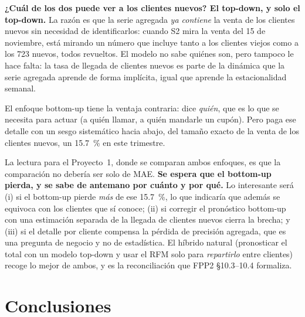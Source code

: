 \documentclass[11pt]{article}
\begin{document}
\textbf{¿Cu\'al de los dos puede ver a los clientes nuevos? El top-down, y
solo el top-down.} La raz\'on es que la serie agregada \emph{ya contiene} la
venta de los clientes nuevos sin necesidad de identificarlos: cuando S2 mira
la venta del 15 de noviembre, est\'a mirando un n\'umero que incluye tanto a
los clientes viejos como a los \num{723} nuevos, todos revueltos. El modelo
no sabe qui\'enes son, pero tampoco le hace falta: la tasa de llegada de
clientes nuevos es parte de la din\'amica que la serie agregada aprende de
forma impl\'icita, igual que aprende la estacionalidad semanal.

El enfoque bottom-up tiene la ventaja contraria: dice \emph{qui\'en}, que es
lo que se necesita para actuar (a qui\'en llamar, a qui\'en mandarle un
cup\'on). Pero paga ese detalle con un sesgo sistem\'atico hacia abajo, del
tama\~no exacto de la venta de los clientes nuevos, un \SI{15.7}{\percent} en
este trimestre.

La lectura para el Proyecto~1, donde se comparan ambos enfoques, es que la
comparaci\'on no deber\'ia ser solo de MAE. \textbf{Se espera que el
bottom-up pierda, y se sabe de antemano por cu\'anto y por qu\'e.} Lo
interesante ser\'a (i) si el bottom-up pierde \emph{m\'as} de ese
\SI{15.7}{\percent}, lo que indicar\'ia que adem\'as se equivoca con los
clientes que s\'i conoce; (ii) si corregir el pron\'ostico bottom-up con una
estimaci\'on separada de la llegada de clientes nuevos cierra la brecha; y
(iii) si el detalle por cliente compensa la p\'erdida de precisi\'on
agregada, que es una pregunta de negocio y no de estad\'istica. El h\'ibrido
natural (pronosticar el total con un modelo top-down y usar el RFM solo para
\emph{repartirlo} entre clientes) recoge lo mejor de ambos, y es la
reconciliaci\'on que FPP2 \S10.3--10.4 formaliza.

\section{Conclusiones}
\end{document}
